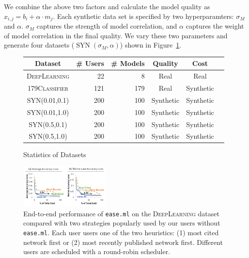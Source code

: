 \documentclass[letterpaper]{vldb}
\DeclareMathOperator{\SYN}{SYN}
\begin{document}
We combine the above two factors and 
calculate the model quality as $x_{i,j} = b_i + \alpha\cdot m_j$. Each synthetic data
set is specified by two hyperparamters:
$\sigma_M$ and $\alpha$. $\sigma_M$ captures
the strength of model correlation, and $\alpha$
captures the weight of model correlation in
the final quality. We vary these two
parameters and generate four datasets
($\SYN(\sigma_M, \alpha)$) shown in Figure~\ref{tab:datasets}.


\begin{figure}
\centering
\small
\begin{tabular}{c | r r | c c c}
\hline
{\bf Dataset} & {\bf \# Users} & {\bf \# Models} & {\bf Quality} & {\bf Cost} \\
\hline
\textsc{DeepLearning} & 22 & 8 & Real & Real \\
\textsc{179Classifier} & 121 & 179 & Real & Synthetic \\
\hline
\textsc{SYN(0.01,0.1)} & 200 & 100 & Synthetic & Synthetic \\
\textsc{SYN(0.01,1.0)} & 200 & 100 & Synthetic & Synthetic \\
\textsc{SYN(0.5,0.1)} & 200 & 100 & Synthetic & Synthetic \\
\textsc{SYN(0.5,1.0)} & 200 & 100 & Synthetic & Synthetic \\
\hline
\end{tabular}
\vspace{-1em}
\caption{Statistics of Datasets}
\label{tab:datasets}
\vspace{-1em}
\end{figure}

\begin{figure}[t!]
\centering
\includegraphics[width=0.4\textwidth]{figures/main}
\vspace{-1.5em}
\caption{End-to-end performance of
\texttt{ease.ml} on the
\textsc{DeepLearning} dataset
compared with two strategies
popularly used by our users 
without \texttt{ease.ml}. 
Each user users one of
the two heuristics:
(1) most cited network first or
(2) most recently published network first. 
Different users are
scheduled with a round-robin scheduler.}
\label{fig:end-to-end}
\vspace{-1em}
\end{figure}
\end{document}
